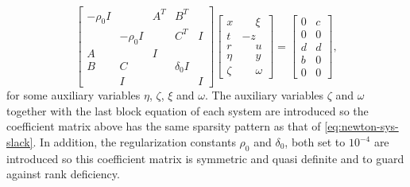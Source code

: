 \documentclass{amsart}
\begin{document}
\[
  \begin{bmatrix}
    -\rho_0 I &           & A^T & B^T        &   \\
              & -\rho_0 I &     & C^T        & I \\
     A        &           & I   &            &   \\
     B        &  C        &     & \delta_0 I &   \\
              &  I        &     &            & I
  \end{bmatrix}
  \begin{bmatrix}
    x     & \phantom{-}\xi \\
    t     & -z  \\
    r     & \phantom{-}u   \\
    \eta  & \phantom{-}y   \\
    \zeta & \phantom{-}\omega
  \end{bmatrix}
  =
  \begin{bmatrix}
    0 & c \\
    0 & 0 \\
    d & d \\
    b & 0 \\
    0 & 0
  \end{bmatrix},
\]
for some auxiliary variables $\eta$, $\zeta$, $\xi$ and $\omega$. The
auxiliary variables $\zeta$ and $\omega$ together with the last block equation
of each system are introduced so the coefficient matrix above has the same
sparsity pattern as that of \eqref{eq:newton-sys-slack}. In addition, the
regularization constants $\rho_0$ and $\delta_0$, both set to $10^{-4}$ are
introduced so this coefficient matrix is symmetric and quasi definite and to
guard against rank deficiency.
\end{document}
